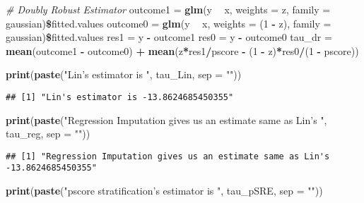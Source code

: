 \documentclass[]{article}
\newenvironment{Shaded}{\begin{snugshade}}{\end{snugshade}}
\newcommand{\KeywordTok}[1]{\textcolor[rgb]{0.13,0.29,0.53}{\textbf{#1}}}
\newcommand{\DataTypeTok}[1]{\textcolor[rgb]{0.13,0.29,0.53}{#1}}
\newcommand{\DecValTok}[1]{\textcolor[rgb]{0.00,0.00,0.81}{#1}}
\newcommand{\StringTok}[1]{\textcolor[rgb]{0.31,0.60,0.02}{#1}}
\newcommand{\CommentTok}[1]{\textcolor[rgb]{0.56,0.35,0.01}{\textit{#1}}}
\newcommand{\OperatorTok}[1]{\textcolor[rgb]{0.81,0.36,0.00}{\textbf{#1}}}
\newcommand{\NormalTok}[1]{#1}
\begin{document}
\begin{Shaded}
\begin{Highlighting}[]
\CommentTok{# Doubly Robust Estimator}
\NormalTok{outcome1 =}\StringTok{ }\KeywordTok{glm}\NormalTok{(y }\OperatorTok{~}\StringTok{ }\NormalTok{x, }\DataTypeTok{weights =}\NormalTok{ z, }\DataTypeTok{family =}\NormalTok{ gaussian)}\OperatorTok{\$}\NormalTok{fitted.values}
\NormalTok{outcome0 =}\StringTok{ }\KeywordTok{glm}\NormalTok{(y }\OperatorTok{~}\StringTok{ }\NormalTok{x, }\DataTypeTok{weights =}\NormalTok{ (}\DecValTok{1} \OperatorTok{-}\StringTok{ }\NormalTok{z), }\DataTypeTok{family =}\NormalTok{ gaussian)}\OperatorTok{\$}\NormalTok{fitted.values}
\NormalTok{res1 =}\StringTok{ }\NormalTok{y }\OperatorTok{-}\StringTok{ }\NormalTok{outcome1}
\NormalTok{res0 =}\StringTok{ }\NormalTok{y }\OperatorTok{-}\StringTok{ }\NormalTok{outcome0}
\NormalTok{tau_dr =}\StringTok{ }\KeywordTok{mean}\NormalTok{(outcome1 }\OperatorTok{-}\StringTok{ }\NormalTok{outcome0) }\OperatorTok{+}\StringTok{ }\KeywordTok{mean}\NormalTok{(z}\OperatorTok{*}\NormalTok{res1}\OperatorTok{/}\NormalTok{pscore }\OperatorTok{-}\StringTok{ }\NormalTok{(}\DecValTok{1} \OperatorTok{-}\StringTok{ }\NormalTok{z)}\OperatorTok{*}\NormalTok{res0}\OperatorTok{/}\NormalTok{(}\DecValTok{1} \OperatorTok{-}\StringTok{ }\NormalTok{pscore))}

\KeywordTok{print}\NormalTok{(}\KeywordTok{paste}\NormalTok{(}\StringTok{"Lin's estimator is "}\NormalTok{, tau_Lin, }\DataTypeTok{sep =} \StringTok{""}\NormalTok{))}
\end{Highlighting}
\end{Shaded}

\begin{verbatim}
## [1] "Lin's estimator is -13.8624685450355"
\end{verbatim}

\begin{Shaded}
\begin{Highlighting}[]
\KeywordTok{print}\NormalTok{(}\KeywordTok{paste}\NormalTok{(}\StringTok{"Regression Imputation gives us an estimate same as Lin's "}\NormalTok{, tau_reg, }\DataTypeTok{sep =} \StringTok{""}\NormalTok{))}
\end{Highlighting}
\end{Shaded}

\begin{verbatim}
## [1] "Regression Imputation gives us an estimate same as Lin's -13.8624685450355"
\end{verbatim}

\begin{Shaded}
\begin{Highlighting}[]
\KeywordTok{print}\NormalTok{(}\KeywordTok{paste}\NormalTok{(}\StringTok{"pscore stratification's estimator is "}\NormalTok{, tau_pSRE, }\DataTypeTok{sep =} \StringTok{""}\NormalTok{))}
\end{Highlighting}
\end{Shaded}
\end{document}
